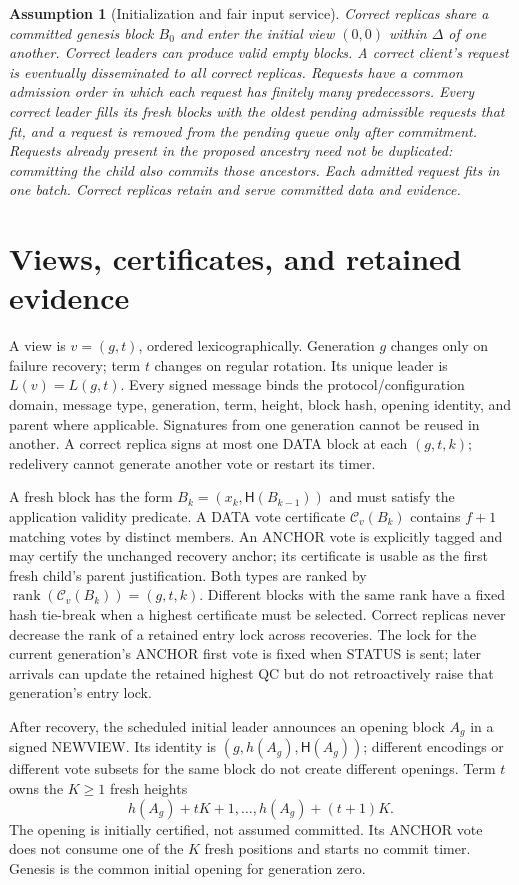 \documentclass[11pt,a4paper]{article}
\newcommand{\QC}{\mathcal C}
\newcommand{\Hash}{\mathsf H}
\newcommand{\rank}{\operatorname{rank}}
\newtheorem{assumption}[assumption]{Assumption}
\newcounter{protocol}
\begin{document}
\begin{assumption}[Initialization and fair input service]
\label{ass:input}
Correct replicas share a committed genesis block $B_0$ and enter the initial
view $(0,0)$ within $\Delta$ of one another. Correct leaders can produce
valid empty blocks. A correct client's request is eventually disseminated
to all correct replicas. Requests have a common admission order in which
each request has finitely many predecessors. Every correct leader fills its
fresh blocks with the oldest pending admissible requests that fit, and a
request is removed from the pending queue only after commitment. Requests
already present in the proposed ancestry need not be duplicated: committing
the child also commits those ancestors. Each admitted request fits in one
batch. Correct replicas retain and serve committed data and evidence.
\end{assumption}

\section{Views, certificates, and retained evidence}
\label{sec:notation}
A view is $v=(g,t)$, ordered lexicographically. Generation $g$ changes only
on failure recovery; term $t$ changes on regular rotation. Its unique leader
is $L(v)=L(g,t)$. Every signed message binds the protocol/configuration
domain, message type, generation, term, height, block hash, opening identity,
and parent where applicable. Signatures from one generation cannot be
reused in another. A correct replica signs at most one DATA block at each
$(g,t,k)$; redelivery cannot generate another vote or restart its timer.

A fresh block has the form $B_k=(x_k,\Hash(B_{k-1}))$ and must satisfy the
application validity predicate. A DATA vote certificate
$\QC_v(B_k)$ contains $f+1$ matching votes by distinct members. An ANCHOR
vote is explicitly tagged and may certify the unchanged recovery anchor;
its certificate is usable as the first fresh child's parent justification.
Both types are ranked by $\rank(\QC_v(B_k))=(g,t,k)$.
Different blocks with the same rank have a fixed hash tie-break when a
highest certificate must be selected. Correct replicas never decrease the
rank of a retained entry lock across recoveries. The lock for the current
generation's ANCHOR first vote is fixed when STATUS is sent; later arrivals
can update the retained highest QC but do not retroactively raise that
generation's entry lock.

After recovery, the scheduled initial leader announces an opening block
$A_g$ in a signed NEWVIEW. Its identity is $(g,h(A_g),\Hash(A_g))$;
different encodings or different vote subsets for the same block do not
create different openings. Term $t$ owns the $K\ge1$ fresh heights
\[
 h(A_g)+tK+1,\ldots,h(A_g)+(t+1)K.
\]
The opening is initially certified, not assumed committed. Its ANCHOR
vote does not consume one of the $K$ fresh positions and starts no commit
timer. Genesis is the common initial opening for generation zero.
\end{document}
